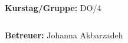 \documentclass[12pt,a4paper]{article}
\begin{document}
\begin{verbatim}


\end{verbatim}
			\begin{flushleft}
			\textbf{\Large{Kurstag/Gruppe:}} \Large{DO/4}
			\end{flushleft}

\begin{verbatim}

\end{verbatim}
			\begin{flushleft}
			\LARGE{\textbf{Betreuer:}}	\Large{Johanna Akbarzadeh}	
			\end{flushleft}

\pagebreak
\setlength{\columnsep}{20pt}
\end{document}
